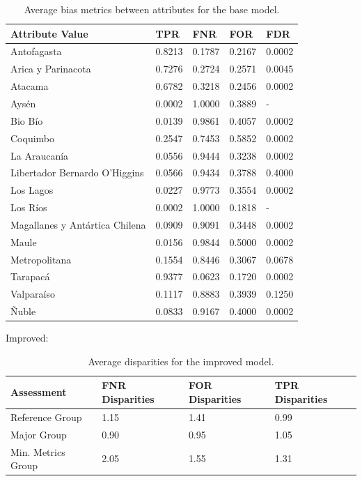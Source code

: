 \documentclass[twoside,11pt]{article}
\begin{document}
\begin{table}[ht]
\centering
\begin{tabular}{|p{3.5cm}|p{1cm}|p{1cm}|p{1cm}|p{1cm}|}
\hline

               \textbf{Attribute Value} &    \textbf{TPR} &    \textbf{FNR} &    \textbf{FOR} &    \textbf{FDR} \\ \hline

                   Antofagasta & 0.8213 & 0.1787 & 0.2167 & 0.0002 \\
            Arica y Parinacota & 0.7276 & 0.2724 & 0.2571 & 0.0045 \\
                       Atacama & 0.6782 & 0.3218 & 0.2456 & 0.0002 \\
                         Aysén & 0.0002 & 1.0000 & 0.3889 &    - \\
                       Bio Bío & 0.0139 & 0.9861 & 0.4057 & 0.0002 \\
                      Coquimbo & 0.2547 & 0.7453 & 0.5852 & 0.0002 \\
                  La Araucanía & 0.0556 & 0.9444 & 0.3238 & 0.0002 \\
 Libertador Bernardo O'Higgins & 0.0566 & 0.9434 & 0.3788 & 0.4000 \\
                     Los Lagos & 0.0227 & 0.9773 & 0.3554 & 0.0002 \\
                      Los Ríos & 0.0002 & 1.0000 & 0.1818 &    - \\
Magallanes y Antártica Chilena & 0.0909 & 0.9091 & 0.3448 & 0.0002 \\
                         Maule & 0.0156 & 0.9844 & 0.5000 & 0.0002 \\
                 Metropolitana & 0.1554 & 0.8446 & 0.3067 & 0.0678 \\
                      Tarapacá & 0.9377 & 0.0623 & 0.1720 & 0.0002 \\
                    Valparaíso & 0.1117 & 0.8883 & 0.3939 & 0.1250 \\
                         Ñuble & 0.0833 & 0.9167 & 0.4000 & 0.0002 \\

\hline
\end{tabular}
\caption{Average bias metrics between attributes for the base model.}
\end{table}

Improved:

\begin{table}[!htb]
\centering
\begin{tabular}{|p{70pt}|p{2cm}|p{2cm}|p{2cm}|}
\hline
        \textbf{Assessment} & \textbf{FNR \break Disparities} & \textbf{FOR \break Disparities} & \textbf{TPR \break Disparities} \\ \hline
        Reference Group & 1.15 & 1.41 & 0.99   \\ 
        Major Group & 0.90 & 0.95 & 1.05  \\ 
        Min. Metrics Group & 2.05 & 1.55 & 1.31 \\ 
        \hline
    \end{tabular}
\caption{Average disparities for the improved model.}
\end{table}
\end{document}
